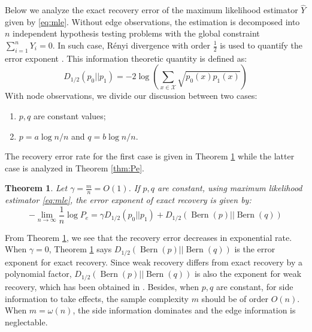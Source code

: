 \documentclass[conference]{IEEEtran}
\newtheorem{theorem}{Theorem}
\DeclareMathOperator{\Bern}{Bern}
\begin{document}
Below we analyze the exact recovery error of the maximum likelihood estimator $\hat{Y}$
given by \eqref{eq:mle}.
Without edge observations, the estimation is decomposed into $n$
independent hypothesis testing problems with the global constraint $\sum_{i=1}^n Y_i=0$. 
In such case, Rényi divergence with order $\frac{1}{2}$
is used to quantify the error exponent \cite{gao2018community}.
This information theoretic quantity is defined as:
\begin{equation}
D_{1/2}(p_0 || p_1) = -2\log(\sum_{x \in \mathcal{X}} \sqrt{p_0(x)p_1(x)} )
\end{equation}
With node observations, we divide our discussion between two cases:
\begin{enumerate}
\item $p,q$ are constant values;
\item $p = a \log n /n$ and $q = b \log n / n$.
\end{enumerate}
The recovery error rate for the first case is given in Theorem \ref{thm:constant} while
the latter case is analyzed in Theorem \ref{thm:Pe}.
\begin{theorem}\label{thm:constant}
	Let $\gamma = \frac{m}{n} = O(1)$. If $p,q$ are constant, using maximum likelihood estimator \eqref{eq:mle},
	the error exponent of exact recovery is given by:
	\begin{equation}
	-\lim_{n\to \infty} \frac{1}{n}\log P_e =  \gamma D_{1/2}(p_0 || p_1) + D_{1/2}(\Bern(p)||\Bern(q))
	\end{equation} 
\end{theorem}
From Theorem \ref{thm:constant}, we see that the recovery error decreases in exponential rate.
When $\gamma=0$, Theorem \ref{thm:constant} says $D_{1/2}(\Bern(p)||\Bern(q))$
is the error exponent for exact recovery. Since weak recovery differs from exact recovery by a polynomial factor, $D_{1/2}(\Bern(p)||\Bern(q))$ is also the exponent for weak recovery, which has been obtained
in \cite{zhang2016}. Besides, when $p,q$ are constant, for side information to take effects, the sample complexity $m$ should be of order $O(n)$. When $m=\omega(n)$, the side information dominates and the edge information is neglectable.
\end{document}
